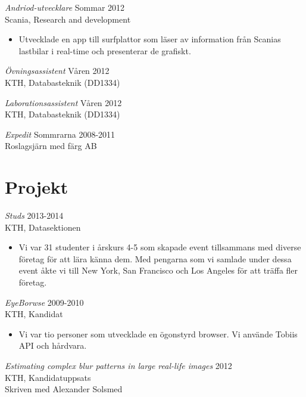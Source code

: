 \documentclass[margin, 10pt]{res} %
\begin{document}
\begin{resume}
{\sl Andriod-utvecklare} \hfill Sommar 2012 \\
Scania, Research and development
\begin{itemize} 
\item Utvecklade en app till surfplattor som läser av information från Scanias lastbilar i real-time och presenterar de grafiskt.
\end{itemize} 

{\sl Övningsassistent} \hfill Våren 2012 \\
KTH, Databasteknik (DD1334)

{\sl Laborationsassistent} \hfill Våren 2012 \\
KTH, Databasteknik (DD1334)

{\sl Expedit} \hfill Sommrarna 2008-2011 \\
Roslagsjärn med färg AB


\section{Projekt}

{\sl Studs} \hfill 2013-2014 \\
KTH, Datasektionen
\begin{itemize} 
\item Vi var 31 studenter i årskurs 4-5 som skapade event tillsammans med diverse företag för att lära känna dem. Med pengarna som vi samlade under dessa event åkte vi till New York, San Francisco och Los Angeles för att träffa fler företag.
\end{itemize} 

{\sl EyeBorwse} \hfill 2009-2010 \\
KTH, Kandidat
\begin{itemize} 
\item Vi var tio personer som utvecklade en ögonstyrd browser. Vi använde Tobiis API och hårdvara.
\end{itemize} 

{\sl Estimating complex blur patterns in large real-life images} \hfill 2012 \\
KTH, Kandidatuppsats \\
Skriven med Alexander Solsmed




\end{resume}
\end{document}
